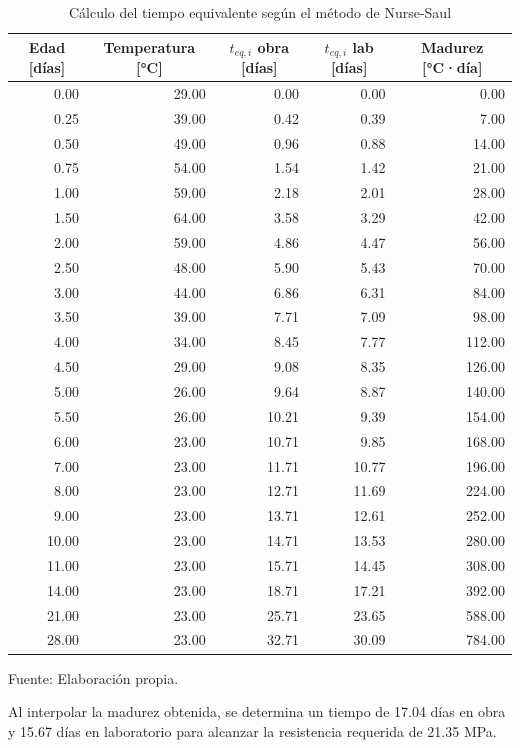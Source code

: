 \begin{table}[H]
\centering
\renewcommand{\arraystretch}{1.15}
\caption{Cálculo del tiempo equivalente según el método de Nurse-Saul}
\begin{tabular}{r r r r r}
\hline
\multicolumn{1}{c}{Edad [días]} & \multicolumn{1}{c}{Temperatura [°C]} & \multicolumn{1}{c}{$t_{eq,i}$ obra [días]} & \multicolumn{1}{c}{$t_{eq,i}$ lab [días]} & \multicolumn{1}{c}{Madurez [°C·día]} \\
\hline
0.00 & 29.00 & 0.00 & 0.00 & 0.00 \\
0.25 & 39.00 & 0.42 & 0.39 & 7.00 \\
0.50 & 49.00 & 0.96 & 0.88 & 14.00 \\
0.75 & 54.00 & 1.54 & 1.42 & 21.00 \\
1.00 & 59.00 & 2.18 & 2.01 & 28.00 \\
1.50 & 64.00 & 3.58 & 3.29 & 42.00 \\
2.00 & 59.00 & 4.86 & 4.47 & 56.00 \\
2.50 & 48.00 & 5.90 & 5.43 & 70.00 \\
3.00 & 44.00 & 6.86 & 6.31 & 84.00 \\
3.50 & 39.00 & 7.71 & 7.09 & 98.00 \\
4.00 & 34.00 & 8.45 & 7.77 & 112.00 \\
4.50 & 29.00 & 9.08 & 8.35 & 126.00 \\
5.00 & 26.00 & 9.64 & 8.87 & 140.00 \\
5.50 & 26.00 & 10.21 & 9.39 & 154.00 \\
6.00 & 23.00 & 10.71 & 9.85 & 168.00 \\
7.00 & 23.00 & 11.71 & 10.77 & 196.00 \\
8.00 & 23.00 & 12.71 & 11.69 & 224.00 \\
9.00 & 23.00 & 13.71 & 12.61 & 252.00 \\
10.00 & 23.00 & 14.71 & 13.53 & 280.00 \\
11.00 & 23.00 & 15.71 & 14.45 & 308.00 \\
14.00 & 23.00 & 18.71 & 17.21 & 392.00 \\
21.00 & 23.00 & 25.71 & 23.65 & 588.00 \\
28.00 & 23.00 & 32.71 & 30.09 & 784.00 \\
\hline
\end{tabular}

Fuente: Elaboración propia.

\end{table}

Al interpolar la madurez obtenida, se determina un tiempo de 17.04 días en obra y 15.67 días en laboratorio para alcanzar la resistencia requerida de 21.35 MPa.


